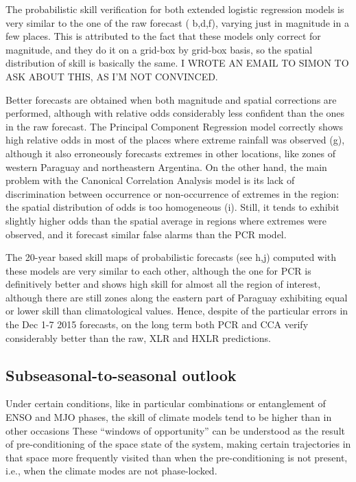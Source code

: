 \documentclass[twocol]{ametsoc}
\begin{document}
The probabilistic skill verification for both extended logistic regression models is very similar to the one of the raw forecast ( b,d,f), varying just in magnitude in a few places. This is attributed to the fact that these models only correct for magnitude, and they do it on a grid-box by grid-box basis, so the spatial distribution of skill is basically the same. I WROTE AN EMAIL TO SIMON TO ASK ABOUT THIS, AS I'M NOT CONVINCED.

Better forecasts are obtained when both magnitude and spatial corrections are performed, although with relative odds considerably less confident than the ones in the raw forecast. The Principal Component Regression model correctly shows high relative odds in most of the places where extreme rainfall was observed (g), although it also erroneously forecasts extremes in other locations, like zones of western Paraguay and northeastern Argentina. On the other hand, the main problem with the Canonical Correlation Analysis model is its lack of discrimination between occurrence or non-occurrence of extremes in the region: the spatial distribution of odds is too homogeneous (i). Still, it tends to exhibit slightly higher odds than the spatial average in regions where extremes were observed, and it forecast similar false alarms than the PCR model.

The 20-year based skill maps of probabilistic forecasts (see h,j) computed with these models are very similar to each other, although the one for PCR is definitively better and shows high skill for almost all the region of interest, although there are still zones along the eastern part of Paraguay exhibiting equal or lower skill than climatological values. Hence, despite of the particular errors in the Dec 1-7 2015 forecasts, on the long term both PCR and CCA verify considerably better than the raw, XLR and HXLR predictions.

\subsection{Subseasonal-to-seasonal outlook}
Under certain conditions, like in particular combinations or entanglement of ENSO and MJO phases, the skill of climate models tend to be higher than in other occasions \citep{Vitart2016,Moron2015,Munoz2016} These ``windows of opportunity'' can be understood as the result of pre-conditioning of the space state of the system, making certain trajectories in that space more frequently visited than when the pre-conditioning is not present, i.e., when the climate modes are not phase-locked.
\end{document}
